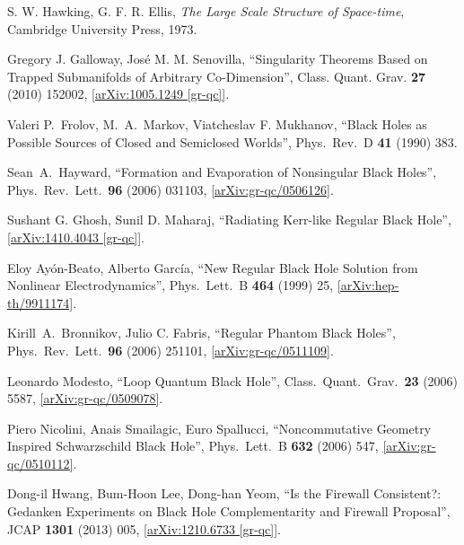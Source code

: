\documentclass[12pt]{article}
\newcommand{\2}{$^2$}
\newcommand{\3}{$^3$}
\newcommand{\4}{$_4$}
\newcommand{\5}{$_5$}
\begin{document}
\begin{thebibliography}{400}
S. W. Hawking, G. F. R. Ellis, \textit{The Large Scale Structure of Space-time}, Cambridge University Press, 1973. 

Gregory J. Galloway, Jos\'e M. M. Senovilla, ``Singularity Theorems Based on Trapped Submanifolds of Arbitrary Co-Dimension'', Class. Quant. Grav. \textbf{27} (2010) 152002,  \href{http://arxiv.org/abs/1005.1249}{[arXiv:1005.1249 [gr-qc]]}.

  Valeri P.~Frolov, M.~A.~Markov, Viatcheslav F. Mukhanov,
  ``Black Holes as Possible Sources of Closed and Semiclosed Worlds'',
  Phys.\ Rev.\ D {\bf 41} (1990) 383.

  Sean~A.~Hayward,
  ``Formation and Evaporation of Nonsingular Black Holes'',
  Phys.\ Rev.\ Lett.\  {\bf 96} (2006) 031103, \href{http://arxiv.org/abs/gr-qc/0506126}{[arXiv:gr-qc/0506126]}.
	
Sushant G. Ghosh, Sunil D. Maharaj, ``Radiating Kerr-like Regular Black Hole'', \href{http://arxiv.org/abs/1410.4043}{[arXiv:1410.4043 [gr-qc]]}. 

Eloy Ayón-Beato, Alberto García,
  ``New Regular Black Hole Solution from Nonlinear Electrodynamics'',
  Phys.\ Lett.\ B {\bf 464} (1999) 25, \href{http://arxiv.org/abs/hep-th/9911174}{[arXiv:hep-th/9911174]}.
	

  Kirill~A.~Bronnikov, Julio C. Fabris,
  ``Regular Phantom Black Holes'',
  Phys.\ Rev.\ Lett.\  {\bf 96} (2006) 251101, \href{http://arxiv.org/abs/gr-qc/0511109}{
  [arXiv:gr-qc/0511109]}.

  Leonardo Modesto,
  ``Loop Quantum Black Hole'', 
  Class.\ Quant.\ Grav.\  {\bf 23} (2006) 5587,
\href{http://arxiv.org/abs/gr-qc/0509078}{[arXiv:gr-qc/0509078]}.

Piero Nicolini, Anais Smailagic, Euro Spallucci,
  ``Noncommutative Geometry Inspired Schwarzschild Black Hole'',
  Phys.\ Lett.\ B {\bf 632} (2006) 547, \href{http://arxiv.org/abs/gr-qc/0510112}{[arXiv:gr-qc/0510112]}.

  Dong-il Hwang, Bum-Hoon Lee, Dong-han Yeom,
  ``Is the Firewall Consistent?: Gedanken Experiments on Black Hole Complementarity and Firewall Proposal'',
  JCAP {\bf 1301} (2013) 005, \href{http://arxiv.org/abs/1210.6733}{[arXiv:1210.6733 [gr-qc]]}.
	

\end{thebibliography}
\end{document}
